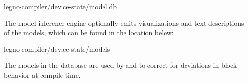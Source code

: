 \begin{snippet}
  legno-compiler/device-state/model.db
\end{snippet}

The model inference engine optionally emits visualizations and text descriptions
of the models, which can be found in the location below:

\begin{snippet}
  legno-compiler/device-state/models
\end{snippet}

The models in the database are used by \lscale and \srcgen to correct for
deviations in block behavior at compile time.